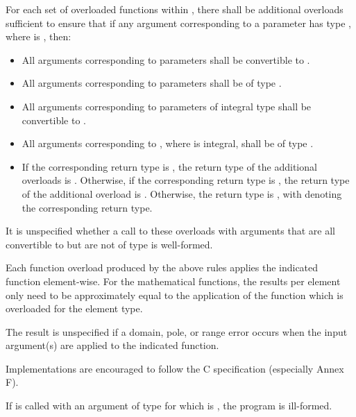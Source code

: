\pnum
For each set of overloaded functions within , there shall be additional overloads sufficient to ensure that if any argument corresponding to a  parameter has type , where  is , then:
\begin{itemize}
  \item All arguments corresponding to  parameters shall be convertible to .
  \item All arguments corresponding to  parameters shall be of type .
  \item All arguments corresponding to parameters of integral type  shall be convertible to .
  \item All arguments corresponding to , where  is integral, shall be of type .
  \item If the corresponding return type is , the return type of the additional overloads is . Otherwise, if the corresponding return type is , the return type of the additional overload is . Otherwise, the return type is , with  denoting the corresponding return type.
\end{itemize}
It is unspecified whether a call to these overloads with arguments that are all convertible to  but are not of type  is well-formed.

\pnum
Each function overload produced by the above rules applies the indicated  function element-wise. For the mathematical functions, the results per element only need to be approximately equal to the application of the function which is overloaded for the element type.

\pnum
The result is unspecified if a domain, pole, or range error occurs when the input argument(s) are applied to the indicated  function.
\begin{note}Implementations are encouraged to follow the C specification (especially Annex F).\end{note}

\pnum
{}

\pnum
If  is called with an argument of type  for which  is , the program is ill-formed.

